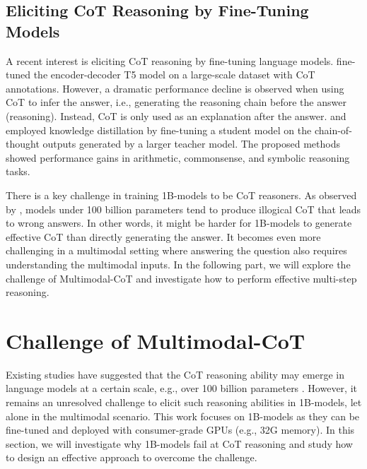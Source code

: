 \documentclass[nohyperref]{article}
\theoremstyle{plain}
\theoremstyle{definition}
\theoremstyle{remark}
\begin{document}
\subsection{Eliciting CoT Reasoning by Fine-Tuning Models}
A recent interest is eliciting CoT reasoning by fine-tuning language models. \citet{lu2022learn} fine-tuned the encoder-decoder T5 model on a large-scale dataset with CoT annotations. However, a dramatic performance decline is observed when using CoT to infer the answer, i.e., generating the reasoning chain before the answer (reasoning). Instead, CoT is only used as an explanation after the answer. \citet{magister2022teaching} and \citet{ho2022large} employed knowledge distillation by fine-tuning a student model on the chain-of-thought outputs generated by a larger teacher model. The proposed methods showed performance gains in arithmetic, commonsense, and symbolic reasoning tasks. 

{There is a key challenge in training 1B-models to be CoT reasoners.} As observed by \citet{cot_wei}, models under 100 billion parameters tend to produce illogical CoT that leads to wrong answers. In other words, it might be harder for 1B-models to generate effective CoT than directly generating the answer. It becomes even more challenging in a multimodal setting where answering the question also requires understanding the multimodal inputs. In the following part, we will explore the challenge of Multimodal-CoT and investigate how to perform effective multi-step reasoning.


\section{Challenge of Multimodal-CoT}\label{sec:prelim}
Existing studies have suggested that the CoT reasoning ability may emerge in language models at a certain scale, e.g., over 100 billion parameters \citep{wei2022emergent}. However, it remains an unresolved challenge to elicit such reasoning abilities in 1B-models, let alone in the multimodal scenario. {This work focuses on 1B-models as they can be fine-tuned and deployed with consumer-grade GPUs (e.g., 32G memory).}
In this section, we will investigate why 1B-models fail at CoT reasoning and study how to design an effective approach to overcome the challenge.
\end{document}
